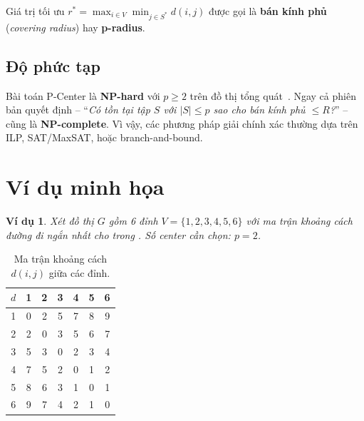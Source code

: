 \documentclass[11pt,a4paper]{article}
\newtheorem{example}{Ví dụ}
\begin{document}
Giá trị tối ưu $r^* = \max_{i \in V} \min_{j \in S^*} d(i,j)$ được gọi là \textbf{bán kính phủ} (\textit{covering radius}) hay \textbf{p-radius}.

\subsection{Độ phức tạp}

Bài toán P-Center là \textbf{NP-hard} với $p \ge 2$ trên đồ thị tổng quát~\cite{kariv1979algorithmic}.
Ngay cả phiên bản quyết định -- ``\emph{Có tồn tại tập $S$ với $|S| \le p$ sao cho bán kính phủ $\le R$?}'' -- cũng là \textbf{NP-complete}.
Vì vậy, các phương pháp giải chính xác thường dựa trên ILP, SAT/MaxSAT, hoặc branch-and-bound.


\section{Ví dụ minh họa}
\label{sec:example}

\begin{example}
Xét đồ thị $G$ gồm 6 đỉnh $V = \{1, 2, 3, 4, 5, 6\}$ với ma trận khoảng cách đường đi ngắn nhất cho trong . Số center cần chọn: $p = 2$.
\end{example}

\begin{table}[h]
\centering
\caption{Ma trận khoảng cách $d(i,j)$ giữa các đỉnh.}
\label{tab:dist_matrix}
\begin{tabular}{c|cccccc}
\toprule
$d$ & 1 & 2 & 3 & 4 & 5 & 6 \\
\midrule
1 & 0 & 2 & 5 & 7 & 8 & 9 \\
2 & 2 & 0 & 3 & 5 & 6 & 7 \\
3 & 5 & 3 & 0 & 2 & 3 & 4 \\
4 & 7 & 5 & 2 & 0 & 1 & 2 \\
5 & 8 & 6 & 3 & 1 & 0 & 1 \\
6 & 9 & 7 & 4 & 2 & 1 & 0 \\
\bottomrule
\end{tabular}
\end{table}
\end{document}
